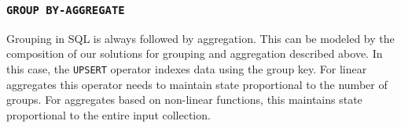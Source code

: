 \documentclass[twocolumn
]{svjour3}
\numberwithin{equation}{section}
\newcommand{\dbsp}{DBSP\xspace}
\newcommand{\code}[1]{\mbox{\texttt{#1}}}
\newcommand{\distinct}{\mathit{dist}}  %
\newcommand{\makeset}{\ensuremath{\mbox{\texttt{UPSERT}}}}
\begin{document}
\subsubsection{\texttt{GROUP BY-AGGREGATE}}

Grouping in SQL is always followed by aggregation.  This can be
modeled by the composition of our solutions for grouping and
aggregation described above.  In this case, the \code{UPSERT} operator
indexes data using the group key.  For linear aggregates this operator
needs to maintain state proportional to the number of groups.  For
aggregates based on non-linear functions, this maintains state
proportional to the entire input collection.


%
%
%
%
%
%
%
\end{document}
